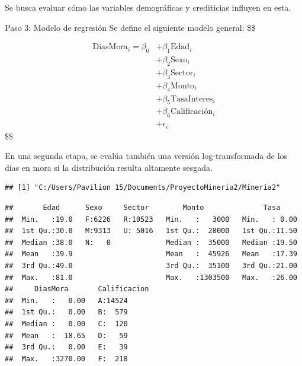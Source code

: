 \documentclass[Royal,times,sageh]{sagej}
\begin{document}
Se busca evaluar cómo las variables demográficas y crediticias influyen
en esta.

Paso 3: Modelo de regresión Se define el siguiente modelo general: \$\$

\begin{align*}
\text{DiasMora}_i = \beta_0 
&+ \beta_1 \text{Edad}_i \\
&+ \beta_2 \text{Sexo}_i \\
&+ \beta_3 \text{Sector}_i \\
&+ \beta_4 \text{Monto}_i \\
&+ \beta_5 \text{TasaInteres}_i \\
&+ \beta_6 \text{Calificación}_i \\
&+ \epsilon_i
\end{align*} \$\$

En una segunda etapa, se evalúa también una versión log-transformada de
los días en mora si la distribución resulta altamente sesgada.

\begin{verbatim}
## [1] "C:/Users/Pavilion 15/Documents/ProyectoMineria2/Mineria2"
\end{verbatim}

\begin{verbatim}
##       Edad      Sexo     Sector        Monto              Tasa      
##  Min.   :19.0   F:6226   R:10523   Min.   :   3000   Min.   : 0.00  
##  1st Qu.:30.0   M:9313   U: 5016   1st Qu.:  28000   1st Qu.:11.50  
##  Median :38.0   N:   0             Median :  35000   Median :19.50  
##  Mean   :39.9                      Mean   :  45926   Mean   :17.39  
##  3rd Qu.:49.0                      3rd Qu.:  35100   3rd Qu.:21.00  
##  Max.   :81.0                      Max.   :1303500   Max.   :26.00  
##     DiasMora       Calificacion
##  Min.   :   0.00   A:14524     
##  1st Qu.:   0.00   B:  579     
##  Median :   0.00   C:  120     
##  Mean   :  18.65   D:   59     
##  3rd Qu.:   0.00   E:   39     
##  Max.   :3270.00   F:  218
\end{verbatim}
\end{document}
